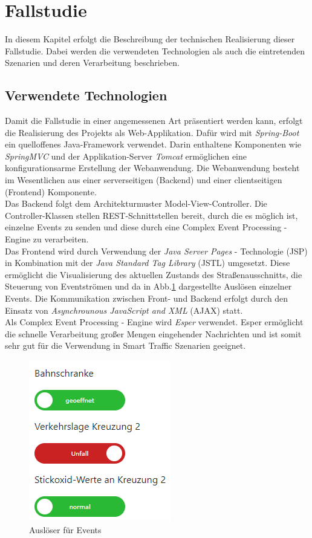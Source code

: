 \section{Fallstudie}
In diesem Kapitel erfolgt die Beschreibung der technischen Realisierung dieser Fallstudie. Dabei werden die verwendeten Technologien als auch die eintretenden Szenarien und deren Verarbeitung beschrieben.

\subsection{Verwendete Technologien}
Damit die Fallstudie in einer angemessenen Art präsentiert werden kann, erfolgt die Realisierung des Projekts als Web-Applikation. Dafür wird mit \textit{Spring-Boot} ein quelloffenes Java-Framework verwendet. Darin enthaltene Komponenten wie \textit{SpringMVC} und der Applikation-Server \textit{Tomcat} ermöglichen eine konfigurationsarme Erstellung der Webanwendung. Die Webanwendung besteht im Wesentlichen aus einer serverseitigen (Backend) und einer clientseitigen (Frontend) Komponente.\\
Das Backend folgt dem Architekturmuster Model-View-Controller. Die Controller-Klassen stellen REST-Schnittstellen bereit, durch die es möglich ist, einzelne Events zu senden und diese durch eine Complex Event Processing - Engine zu verarbeiten.\\
Das Frontend wird durch Verwendung der \textit{Java Server Pages} - Technologie (JSP) in Kombination mit der \textit{Java Standard Tag Library} (JSTL) umgesetzt. Diese ermöglicht die Visualisierung des aktuellen Zustands des Straßenausschnitts, die Steuerung von Eventströmen und da in Abb.\ref{fig5} dargestellte Auslösen einzelner Events. Die Kommunikation zwischen Front- und Backend erfolgt durch den Einsatz von \textit{Asynchrounous JavaScript and XML} (AJAX) statt.\\
Als Complex Event Processing - Engine wird \textit{Esper} verwendet. Esper ermöglicht die schnelle Verarbeitung großer Mengen eingehender Nachrichten und ist somit sehr gut für die Verwendung in Smart Traffic Szenarien geeignet. 

\begin{figure}[ht]
\begin{center}
	\includegraphics[scale=0.7]{images/EventTrigger.png}
	\caption{Auslöser für Events}
	\label{fig5}
\end{center}
\end{figure}

